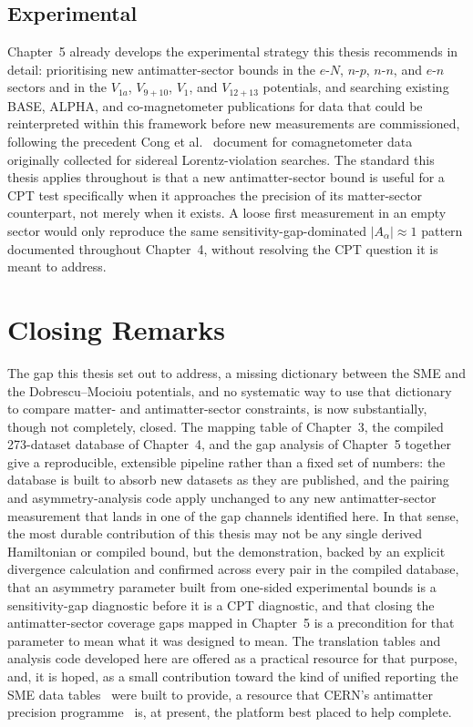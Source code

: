 \documentclass[main]{subfiles}
\begin{document}
\subsection{Experimental}

Chapter~5 already develops the experimental strategy this thesis
recommends in detail: prioritising new antimatter-sector bounds in the
$e$-$N$, $n$-$p$, $n$-$n$, and $e$-$n$ sectors and in the $V_{1a}$,
$V_{9+10}$, $V_1$, and $V_{12+13}$ potentials, and searching existing BASE,
ALPHA, and co-magnetometer publications for data that could be
reinterpreted within this framework before new measurements are
commissioned, following the precedent Cong et al.~\cite{Cong2025} document
for comagnetometer data originally collected for sidereal Lorentz-violation
searches. The standard this thesis applies throughout is that a new
antimatter-sector bound is useful for a CPT test specifically when it
approaches the precision of its matter-sector counterpart, not merely when
it exists. A loose first measurement in an empty sector would only
reproduce the same sensitivity-gap-dominated $|A_\alpha|\approx1$ pattern
documented throughout Chapter~4, without resolving the CPT question it is
meant to address.

\section{Closing Remarks}

The gap this thesis set out to address, a missing dictionary between the
SME and the Dobrescu--Mocioiu potentials, and no systematic way to use that
dictionary to compare matter- and antimatter-sector constraints, is now
substantially, though not completely, closed. The mapping table of
Chapter~3, the compiled 273-dataset database of Chapter~4, and the gap
analysis of Chapter~5 together give a reproducible, extensible pipeline
rather than a fixed set of numbers: the database is built to absorb new
datasets as they are published, and the pairing and asymmetry-analysis code
apply unchanged to any new antimatter-sector measurement that lands in one
of the gap channels identified here. In that sense, the most durable
contribution of this thesis may not be any single derived Hamiltonian or
compiled bound, but the demonstration, backed by an explicit divergence
calculation and confirmed across every pair in the compiled database,
that an asymmetry parameter built from one-sided experimental bounds is a
sensitivity-gap diagnostic before it is a CPT diagnostic, and that closing
the antimatter-sector coverage gaps mapped in Chapter~5 is a precondition
for that parameter to mean what it was designed to mean. The translation
tables and analysis code developed here are offered as a practical
resource for that purpose, and, it is hoped, as a small contribution toward
the kind of unified reporting the SME data tables~\cite{Kostelecky2011}
were built to provide, a resource that CERN's antimatter precision
programme~\cite{Smorra2017,Ahmadi2017} is, at present, the platform best
placed to help complete.
\end{document}
